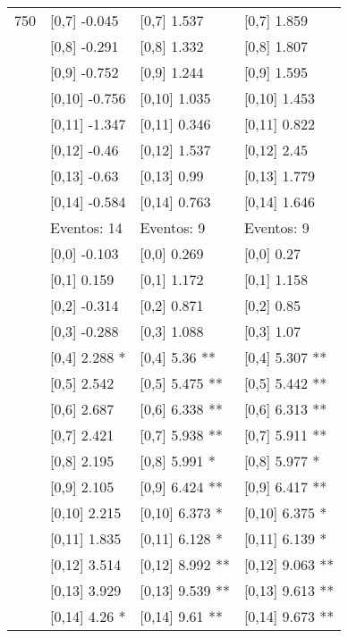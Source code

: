 \begin{table}
\begin{tabular}[t]{llll}
750 & {}[0,7] -0.045 & {}[0,7] 1.537 & {}[0,7] 1.859\\
\addlinespace
 & {}[0,8] -0.291 & {}[0,8] 1.332 & {}[0,8] 1.807\\
 & {}[0,9] -0.752 & {}[0,9] 1.244 & {}[0,9] 1.595\\
 & {}[0,10] -0.756 & {}[0,10] 1.035 & {}[0,10] 1.453\\
 & {}[0,11] -1.347 & {}[0,11] 0.346 & {}[0,11] 0.822\\
 & {}[0,12] -0.46 & {}[0,12] 1.537 & {}[0,12] 2.45\\
\addlinespace
 & {}[0,13] -0.63 & {}[0,13] 0.99 & {}[0,13] 1.779\\
 & {}[0,14] -0.584 & {}[0,14] 0.763 & {}[0,14] 1.646\\
 & Eventos:  14 & Eventos:  9 & Eventos:  9\\
 & {}[0,0] -0.103 & {}[0,0] 0.269 & {}[0,0] 0.27\\
 & {}[0,1] 0.159 & {}[0,1] 1.172 & {}[0,1] 1.158\\
\addlinespace
 & {}[0,2] -0.314 & {}[0,2] 0.871 & {}[0,2] 0.85\\
 & {}[0,3] -0.288 & {}[0,3] 1.088 & {}[0,3] 1.07\\
 & {}[0,4] 2.288 * & {}[0,4] 5.36 ** & {}[0,4] 5.307 **\\
 & {}[0,5] 2.542 & {}[0,5] 5.475 ** & {}[0,5] 5.442 **\\
 & {}[0,6] 2.687 & {}[0,6] 6.338 ** & {}[0,6] 6.313 **\\
\addlinespace
1000 & {}[0,7] 2.421 & {}[0,7] 5.938 ** & {}[0,7] 5.911 **\\
 & {}[0,8] 2.195 & {}[0,8] 5.991 * & {}[0,8] 5.977 *\\
 & {}[0,9] 2.105 & {}[0,9] 6.424 ** & {}[0,9] 6.417 **\\
 & {}[0,10] 2.215 & {}[0,10] 6.373 * & {}[0,10] 6.375 *\\
 & {}[0,11] 1.835 & {}[0,11] 6.128 * & {}[0,11] 6.139 *\\
\addlinespace
 & {}[0,12] 3.514 & {}[0,12] 8.992 ** & {}[0,12] 9.063 **\\
 & {}[0,13] 3.929 & {}[0,13] 9.539 ** & {}[0,13] 9.613 **\\
 & {}[0,14] 4.26 * & {}[0,14] 9.61 ** & {}[0,14] 9.673 **\\
\bottomrule
\end{tabular}
\end{table}
